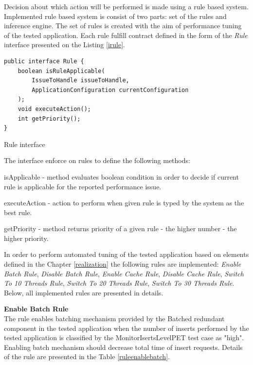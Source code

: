 \documentclass[12pt,a4paper]{article}
\let\tempone\itemize
\let\temptwo\enditemize
\renewenvironment{itemize}{\tempone\addtolength{\itemsep}{-0.4\baselineskip}}{\temptwo}
\begin{document}
Decision about which action will be performed is made using a rule based system. Implemented rule based system is consist of two parts: set of the rules and inference engine. The set of rules is created with the aim of performance tuning of the tested application. Each rule fulfill contract defined in the form of the \textit{Rule} interface presented on the Listing \ref{irule}.

\begin{listing}[ht]\begin{verbatim}
public interface Rule {
    boolean isRuleApplicable(
    	IssueToHandle issueToHandle, 
    	ApplicationConfiguration currentConfiguration
    );
    void executeAction();
    int getPriority();
}
\end{verbatim}
\caption{Rule interface} \label{irule}
\end{listing}

The interface enforce on rules to define the following methods: 
\begin{itemize}
\item isApplicable - method evaluates boolean condition in order to decide if current rule is applicable for the reported performance issue.   
\item executeAction - action to perform when given rule is typed by the system as the best rule.   
\item getPriority - method returns priority of a given rule - the higher number - the higher priority.  
\end{itemize}

In order to perform automated tuning of the tested application based on elements defined in the Chapter \ref{realization} the following rules are implemented: \textit{Enable Batch Rule}, \textit{Disable Batch Rule}, \textit{Enable Cache Rule}, \textit{Disable Cache Rule}, \textit{Switch To 10 Threads Rule}, \textit{Switch To 20 Threads Rule}, \textit{Switch To 30 Threads Rule}. Below, all implemented rules are presented in details.  

\vspace{5mm}

\noindent\textbf{Enable Batch Rule} \\
The rule enables batching mechanism provided by the Batched redundant component in the tested application when the number of  inserts performed by the tested application is classified by the MonitorIsertsLevelPET test case as "high". Enabling batch mechanism should decrease total time of insert requests. Details of the rule are presented in the Table \ref{ruleenablebatch}.
\end{document}
